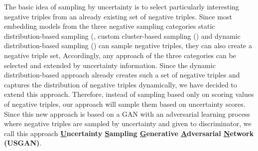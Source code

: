 The basic idea of sampling by uncertainty is to select particularly interesting negative triples from an already existing set of negative triples.
Since most embedding models from the three negative sampling categories static distribution-based sampling (, 
custom cluster-based sampling () and 
dynamic distribution-based sampling ()
can sample negative triples, they can also create a negative triple set,
Accordingly, any approach of the three categories can be selected and extended by uncertainty information.
Since the dynamic distribution-based approach \kbgan already creates such a set of negative triples and captures the distribution of negative triples dynamically, we have decided to extend this approach.
Therefore, instead of sampling based only on scoring values of negative triples, our approach will sample them based on uncertainty scores.
Since this new approach is based on a \ac{GAN} with an adversarial learning process where negative triples are sampled by uncertainty and given to discriminator, we call this approach \textbf{\underline{U}ncertainty \underline{S}ampling \underline{G}enerative \underline{A}dversarial \underline{N}etwork (\textsc{USGAN})}.
